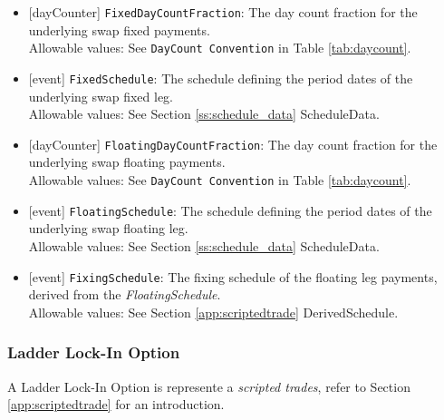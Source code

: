 \begin{itemize}
  \item{}[dayCounter] \lstinline!FixedDayCountFraction!: The day count fraction for the underlying swap fixed payments. \\
  Allowable values: See \lstinline!DayCount Convention! in Table \ref{tab:daycount}.
  \item{}[event] \lstinline!FixedSchedule!: The schedule defining the period dates of the underlying swap fixed leg. \\
  Allowable values: See Section \ref{ss:schedule_data} ScheduleData.
  \item{}[dayCounter] \lstinline!FloatingDayCountFraction!: The day count fraction for the underlying swap floating payments. \\
  Allowable values: See \lstinline!DayCount Convention! in Table \ref{tab:daycount}.
  \item{}[event] \lstinline!FloatingSchedule!: The schedule defining the period dates of the underlying swap floating leg. \\
  Allowable values: See Section \ref{ss:schedule_data} ScheduleData.
  \item{}[event] \lstinline!FixingSchedule!: The fixing schedule of the floating leg payments, derived from the \emph{FloatingSchedule}. \\
  Allowable values: See Section \ref{app:scriptedtrade} DerivedSchedule.
\end{itemize}

\subsubsection{Ladder Lock-In Option}


A Ladder Lock-In Option is represente a {\em scripted trades}, refer to Section
\ref{app:scriptedtrade} for an introduction.

